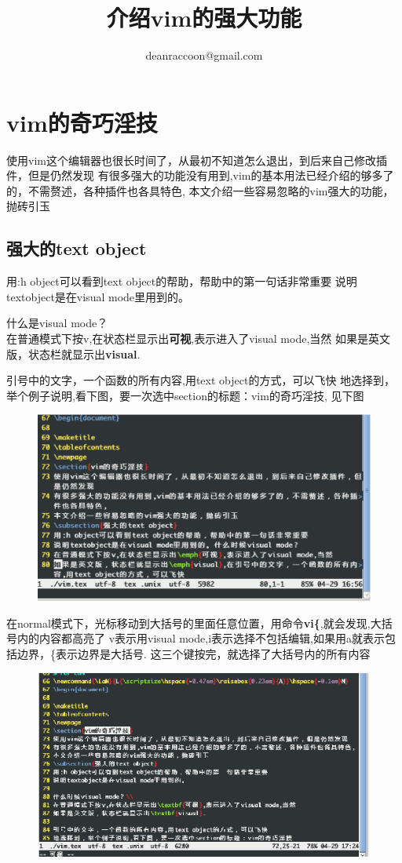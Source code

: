 \documentclass[adobefonts]{ctexart}
\title{\textbf{介绍vim的强大功能}}
\author{deanraccoon@gmail.com}
\begin{document}
\maketitle
\tableofcontents
\newpage
\section{vim的奇巧淫技}
使用vim这个编辑器也很长时间了，从最初不知道怎么退出，到后来自己修改插件，但是仍然发现
有很多强大的功能没有用到,vim的基本用法已经介绍的够多了的，不需赘述，各种插件也各具特色,
本文介绍一些容易忽略的vim强大的功能，抛砖引玉
\subsection{强大的text object}
用:h object可以看到text object的帮助，帮助中的第一句话非常重要
说明textobject是在visual mode里用到的。

什么是visual mode？\\
在普通模式下按v,在状态栏显示出\textbf{可视},表示进入了visual mode,当然
如果是英文版，状态栏就显示出\textbf{visual}.

引号中的文字，一个函数的所有内容,用text object的方式，可以飞快
地选择到，举个例子说明,看下图，要一次选中section的标题：vim的奇巧淫技,
见下图

\begin{figure}[htbp]
	\includegraphics[width=12cm]{select.eps}
\end{figure}
在normal模式下，光标移动到大括号的里面任意位置，用命令\textbf{vi\{},就会发现,大括号内的内容都高亮了
v表示用visual mode,i表示选择不包括编辑,如果用a就表示包括边界，\{表示边界是大括号.
这三个键按完，就选择了大括号内的所有内容
\begin{figure}
\includegraphics[width=12cm]{selected.eps}
\end{figure}
\end{document}

